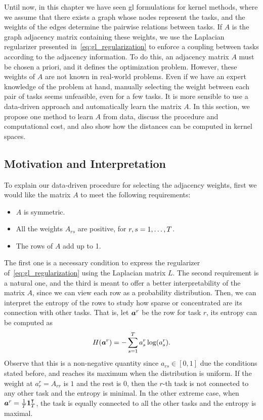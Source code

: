 Until now, in this chapter we have seen \acrshort{gl} formulations for kernel methods, where we assume that there exists a graph whose nodes represent the tasks, and the weights of the edges determine the pairwise relations between tasks. 
%
If $A$ is the graph adjacency matrix containing these weights, we use the Laplacian regularizer 
presented in~\eqref{eq:gl_regularization} to enforce a coupling between tasks according to the adjacency information.
To do this, an adjacency matrix $A$ must be chosen a priori, and it defines the optimization problem.
However, these weights of $A$ are not known in real-world problems. Even if we have an expert knowledge of the problem at hand, manually selecting the weight between each pair of tasks seems unfeasible, even for a few tasks.
It is more sensible to use a data-driven approach and automatically learn the matrix $A$.
In this section, we propose one method to learn $A$ from data, discuss the procedure and computational cost, and also show how the distances can be computed in kernel spaces.

\subsection{Motivation and Interpretation}
To explain our data-driven procedure for selecting the adjacency weights, first we would like the matrix $A$ to meet the following requirements:
\begin{itemize}
    \item $A$ is symmetric.
    \item All the weights $A_{rs}$ are positive, for $r, s=1, \ldots, T$.
    \item The rows of $A$ add up to 1. 
\end{itemize} 
The first one is a necessary condition to express the regularizer of~\eqref{eq:gl_regularization} using the Laplacian matrix $L$.
The second requirement is a natural one, and the third is meant to offer a better interpretability of the matrix $A$, since we can view each row as a probability distribution. 
%
Then, we can interpret the entropy of the rows to study how sparse or concentrated are its connection with other tasks. That is, let $\bm{a}^r$ be the row for task $r$, its entropy can be computed as
\begin{equation}
    \nonumber
    H(\bm{a}^r) = -\sum_{s=1}^T a^r_s \log(a^r_s).
\end{equation}
Observe that this is a non-negative quantity since $a_{rs} \in [0, 1]$ due the conditions stated before, and reaches its maximum when the distribution is uniform.
If the weight at $a^r_r = A_{rr}$ is $1$ and the rest is $0$, then the $r$-th task is not connected to any other task and the entropy is minimal. In the other extreme case, when $\bm{a}^r = \frac{1}{T} \bm{1}_T^\intercal$, the task is equally connected to all the other tasks and the entropy is maximal.
%

